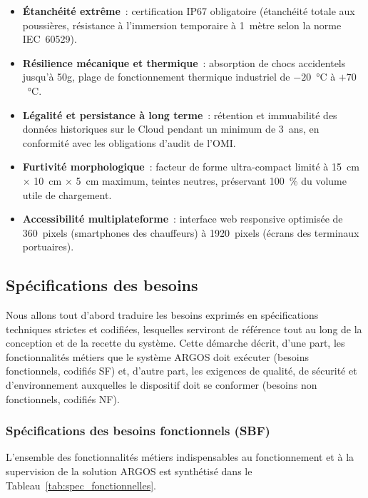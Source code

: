 \begin{itemize}
\item \textbf{Étanchéité extrême}~: certification IP67 obligatoire (étanchéité totale aux poussières, résistance à l'immersion temporaire à 1~mètre selon la norme IEC~60529).
\item \textbf{Résilience mécanique et thermique}~: absorption de chocs accidentels jusqu'à 50g, plage de fonctionnement thermique industriel de $-20$~°C à $+70$~°C.
\item \textbf{Légalité et persistance à long terme}~: rétention et immuabilité des données historiques sur le Cloud pendant un minimum de 3~ans, en conformité avec les obligations d'audit de l'OMI.
\end{itemize}

\begin{itemize}
\item \textbf{Furtivité morphologique}~: facteur de forme ultra-compact limité à 15~cm $\times$ 10~cm $\times$ 5~cm maximum, teintes neutres, préservant 100~\% du volume utile de chargement.
\item \textbf{Accessibilité multiplateforme}~: interface web responsive optimisée de 360~pixels (smartphones des chauffeurs) à 1920~pixels (écrans des terminaux portuaires).
\end{itemize}

\subsection{Spécifications des besoins}
\label{sec-specifications}
Nous allons tout d'abord traduire les besoins exprimés en spécifications techniques strictes et codifiées, lesquelles serviront de référence tout au long de la conception et de la recette du système. Cette démarche décrit, d'une part, les fonctionnalités métiers que le système ARGOS doit exécuter (besoins fonctionnels, codifiés SF) et, d'autre part, les exigences de qualité, de sécurité et d'environnement auxquelles le dispositif doit se conformer (besoins non fonctionnels, codifiés NF).

\subsubsection{Spécifications des besoins fonctionnels (SBF)}

L'ensemble des fonctionnalités métiers indispensables au fonctionnement et à la supervision de la solution ARGOS est synthétisé dans le Tableau~\ref{tab:spec_fonctionnelles}.

